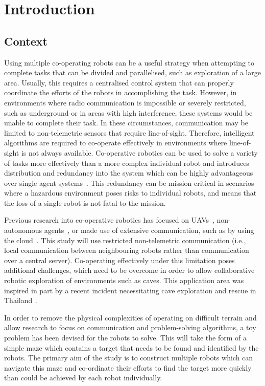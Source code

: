 
\chapter{Introduction}\label{introduction}
\section{Context}\label{introduction/context}
Using multiple co-operating robots can be a useful strategy when attempting
to complete tasks that can be divided and parallelised, such as exploration of a large
area. Usually, this requires a centralised control system that can properly coordinate
the efforts of the robots in accomplishing the task. However, in environments
where radio communication is impossible or severely restricted, such as underground
or in areas with high interference, these systems would be unable to complete
their task. In these circumstances, communication may be limited to
non-telemetric sensors that require line-of-sight. Therefore, intelligent
algorithms are required to co-operate effectively in environments where line-of-sight
is not always available.
Co-operative robotics can be used to solve a variety of tasks
more effectively than a more complex individual robot and introduces
distribution and redundancy into the system which can be
highly advantageous over single agent systems~\cite{dudek96}. This redundancy
can be mission critical in scenarios where a hazardous environment poses risks
to individual robots, and means that the loss of a single robot is not fatal to
the mission.

Previous research into co-operative robotics has focused on UAVs~\cite{khan18},
non-autonomous agents~\cite{jimenez18}, or made use of extensive communication,
such as by using the cloud~\cite{wensing2018cooperative}. This study will use
restricted non-telemetric communication (i.e., local communication between
neighbouring robots rather than communication over a central server). Co-operating
effectively under this limitation poses additional challenges, which need to be overcome
in order to allow collaborative robotic exploration of environments such as caves.
This application area was inspired in part by a recent incident necessitating cave
exploration and rescue in Thailand~\cite{bbcthailand}.

In order to remove the physical complexities of operating on difficult
terrain and allow research to focus on communication and problem-solving algorithms,
a toy problem has been devised for the robots to solve. This will take the form
of a simple maze which contains a target that needs to be found and identified
by the robots. The primary aim of the study is to construct multiple robots which can
navigate this maze and co-ordinate their efforts to find the target more quickly than
could be achieved by each robot individually.

